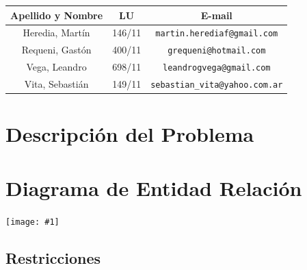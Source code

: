 \documentclass[a4paper, 10pt, twoside]{article}
\newcommand{\diagramah}[1]{
  \texttt{[image: \#1]}
}
\begin{document}
\begin{center}
\vspace{0.5cm}

\begin{tabular}{|c|c|c|}
\hline
Apellido y Nombre & LU & E-mail\\
\hline
Heredia, Martín  & 146/11 & {\tt martin.herediaf@gmail.com}\\
Requeni, Gastón  & 400/11 & {\tt grequeni@hotmail.com}\\
Vega, Leandro    & 698/11 & {\tt leandrogvega@gmail.com}\\
Vita, Sebastián  & 149/11 & {\tt sebastian\_vita@yahoo.com.ar}\\
\hline
\end{tabular}

\end{center}

\newpage
{} 



\tableofcontents

\newpage



\section{Descripción del Problema}


\newpage




\section{Diagrama de Entidad Relación}
\diagramah{DER}

\newpage

\subsection{Restricciones}
%
\end{document}
